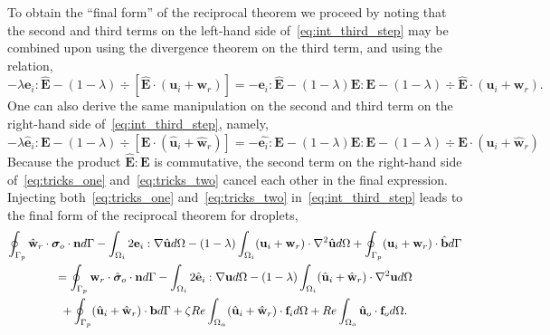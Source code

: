 To obtain the ``final form'' of the reciprocal theorem we proceed by noting that the second and third terms on the left-hand side  of~\ref{eq:int_third_step} may be combined upon using the divergence theorem on the third term, and using the relation, 
\begin{equation}
    - \lambda \textbf{e}_i : \hat{\textbf{E}}
    - (1-\lambda)\div [\hat{\textbf{E}} \cdot (\textbf{u}_i + \textbf{w}_r)]
    =
    - \textbf{e}_i : \hat{\textbf{E}}
    - (1-\lambda) \hat{\textbf{E}}:\textbf{E}
    - (1-\lambda)\div \hat{\textbf{E}} \cdot (\textbf{u}_i + \textbf{w}_r).
    \label{eq:tricks_two}
\end{equation}
One can also derive the same manipulation on the second and third term on the right-hand side of~\ref{eq:int_third_step}, namely,
\begin{equation}
    - \lambda \hat{\textbf{e}}_i : {\textbf{E}}
    - (1-\lambda)\div [{\textbf{E}} \cdot (\hat{\textbf{u}}_i + \hat{\textbf{w}}_r)]
    =
    - \hat{\textbf{e}_i} : {\textbf{E}}
    - (1-\lambda) \hat{\textbf{E}}:\textbf{E}
    - (1-\lambda)\div {\textbf{E}} \cdot (\hat{\textbf{u}}_i + \hat{\textbf{w}}_r)
    \label{eq:tricks_one}
\end{equation}
Because the product $\hat{\textbf{E}} : {\textbf{E}}$ is commutative, the second term on the right-hand side of~\ref{eq:tricks_one} and~\ref{eq:tricks_two} cancel each other in the final expression.  
Injecting both~\ref{eq:tricks_one} and~\ref{eq:tricks_two} in~\ref{eq:int_third_step} leads to the final form of the reciprocal theorem for droplets, 
\begin{multline}
    \intS[p]{\hat{\textbf{w}}_{r} \cdot  \bm\sigma_{o}\cdot \textbf{n}}
    - \intO[i]{2\textbf{e}_i : \grad\hat{\textbf{u}}}
    - (1-\lambda) \intO[i]{(\textbf{u}_{i} + \textbf{w}_r)\cdot \grad^2 \hat{\textbf{u}}}
    + \intS[p]{(\textbf{u}_{i} + \textbf{w}_r)\cdot \hat{\textbf{b}}}
    \\
    =
    \intS[p]{\textbf{w}_{r}\cdot \hat{\bm\sigma}_{o}\cdot \textbf{n}}
    - \intO[i]{2\hat{\textbf{e}}_i :\grad\textbf{u}}
    - (1-\lambda) \intO[i]{(\hat{\textbf{u}}_{i} + \hat{\textbf{w}}_r) \cdot \grad^2 \textbf{u} }\\ 
    + \intS[p]{(\hat{\textbf{u}}_{i} + \hat{\textbf{w}}_r) \cdot  \textbf{b}}
    + \zeta Re \intO{(\hat{\textbf{u}}_i+\hat{\textbf{w}}_r)\cdot \textbf{f}_{i}} 
    + Re\intO[o]{\hat{\textbf{u}}_{o}\cdot \textbf{f}_{o}}.
    \label{eq:int_final_step}
\end{multline}
